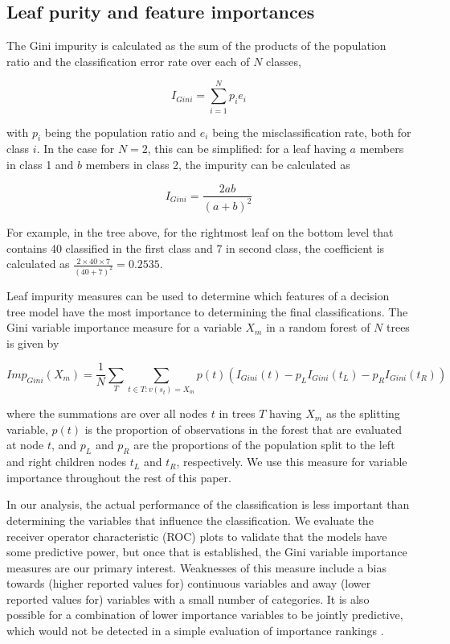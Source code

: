 \subsection{Leaf purity and feature importances}
The Gini impurity is calculated as the sum of the products of the population ratio and the classification error rate over each of $N$ classes,

$$I_{Gini} = \sum_{i=1}^{N}{p_i e_i}$$

with $p_{i}$ being the population ratio and $e_{i}$ being the misclassification rate, both for class $i$. In the case for $N=2$, this can be simplified: for a leaf having $a$ members in class 1 and $b$ members in class 2, the impurity can be calculated as

$$I_{Gini} = \frac{2 a b}{(a+b)^2}$$

For example, in the tree above, for the rightmost leaf on the bottom level that contains 40 classified in the first class and 7 in second class, the coefficient is calculated as $\frac{2 \times 40 \times 7}{(40+7)^2} = 0.2535$.

Leaf impurity measures can be used to determine which features of a decision tree model have the most importance to determining the final classifications. The Gini variable importance measure for a variable $X_m$ in a random forest of $N$ trees is given by \cite{NIPS2013_4928}

$$Imp_{Gini}(X_m) = \frac{1}{N} \sum_T \sum_{t \in{T}: v(s_t)=X_m}{p(t)(I_{Gini}(t)-p_L I_{Gini}(t_L)-p_R I_{Gini}(t_R))}$$

where the summations are over all nodes $t$ in trees $T$ having $X_m$ as the splitting variable, $p(t)$ is the proportion of observations in the forest that are evaluated at node $t$, and $p_L$ and $p_R$ are the proportions of the population split to the left and right children nodes $t_L$ and $t_R$, respectively. We use this measure for variable importance throughout the rest of this paper.

In our analysis, the actual performance of the classification is less important than determining the variables that influence the classification. We evaluate the receiver operator characteristic (ROC) plots to validate that the models have some predictive power, but once that is established, the Gini variable importance measures are our primary interest. Weaknesses of this measure include a bias towards (higher reported values for) continuous variables and away (lower reported values for) variables with a small number of categories. It is also possible for a combination of lower importance variables to be jointly predictive, which would not be detected in a simple evaluation of importance rankings \cite{Epifanio_2017}.